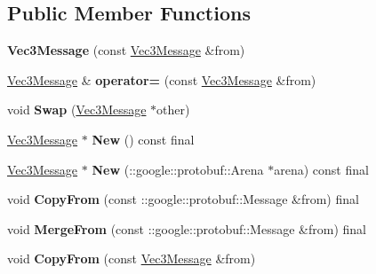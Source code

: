 \subsection*{Public Member Functions}
\begin{DoxyCompactItemize}
\item 
\mbox{\label{classtbMath_1_1Vec3Message_a41a4de86cb62cb87f461ebe252a9d4f3}} 
{\bfseries Vec3\+Message} (const \hyperlink{classtbMath_1_1Vec3Message}{Vec3\+Message} \&from)
\item 
\mbox{\label{classtbMath_1_1Vec3Message_ad489337e1e4fba7a0eb1b5529f41e4f6}} 
\hyperlink{classtbMath_1_1Vec3Message}{Vec3\+Message} \& {\bfseries operator=} (const \hyperlink{classtbMath_1_1Vec3Message}{Vec3\+Message} \&from)
\item 
\mbox{\label{classtbMath_1_1Vec3Message_ae06ac13a66af19b34fd569aa6d95aa3e}} 
void {\bfseries Swap} (\hyperlink{classtbMath_1_1Vec3Message}{Vec3\+Message} $\ast$other)
\item 
\mbox{\label{classtbMath_1_1Vec3Message_a5015fd240d9c4e83de0d1f8eb3ab677f}} 
\hyperlink{classtbMath_1_1Vec3Message}{Vec3\+Message} $\ast$ {\bfseries New} () const final
\item 
\mbox{\label{classtbMath_1_1Vec3Message_a9eb410f38eadcd7f5c5b274c58d88bb5}} 
\hyperlink{classtbMath_1_1Vec3Message}{Vec3\+Message} $\ast$ {\bfseries New} (\+::google\+::protobuf\+::\+Arena $\ast$arena) const final
\item 
\mbox{\label{classtbMath_1_1Vec3Message_accf553382d3ffedde982c6adfa4ad8b9}} 
void {\bfseries Copy\+From} (const \+::google\+::protobuf\+::\+Message \&from) final
\item 
\mbox{\label{classtbMath_1_1Vec3Message_a39f0b398257ee94ddfab9e9be84ceb37}} 
void {\bfseries Merge\+From} (const \+::google\+::protobuf\+::\+Message \&from) final
\item 
\mbox{\label{classtbMath_1_1Vec3Message_aef977694f781d9a18860cabe6d0b776c}} 
void {\bfseries Copy\+From} (const \hyperlink{classtbMath_1_1Vec3Message}{Vec3\+Message} \&from)

\end{DoxyCompactItemize}
